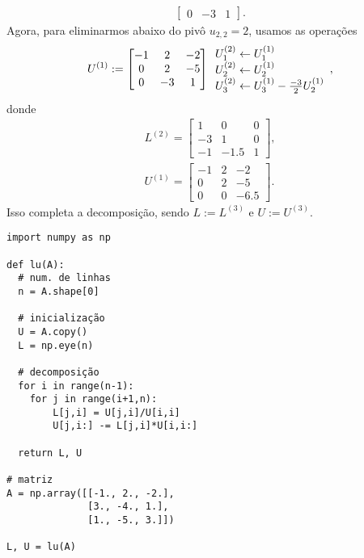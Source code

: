 \begin{ex}
\begin{align}
\begin{bmatrix}
      0 & -3 & 1
    \end{bmatrix}.
  \end{align}
  Agora, para eliminarmos abaixo do pivô $u_{2,2}=2$, usamos as operações
  \begin{equation}
    U^{(1)} :=
    \begin{bmatrix}
      -1 & 2 & -2\\
      0 & 2 & -5\\
      0 & -3 & 1
    \end{bmatrix}
    \begin{array}[]l
      U_1^{(2)}\leftarrow U_1^{(1)} \\
      U_2^{(2)}\leftarrow U_2^{(1)} \\
      U_3^{(2)}\leftarrow U_3^{(1)} - \frac{-3}{2}U_2^{(1)}
    \end{array},
  \end{equation}
  donde
  \begin{align}
    L^{(2)} =
    \begin{bmatrix}
      1 & 0 & 0\\
      -3 & 1 & 0\\
      -1 & -1.5 & 1
    \end{bmatrix},\\
    U^{(1)} =
    \begin{bmatrix}
      -1 & 2 & -2\\
      0 & 2 & -5\\
      0 & 0 & -6.5
    \end{bmatrix}.
  \end{align}
Isso completa a decomposição, sendo $L := L^{(3)}$ e $U := U^{(3)}$.

\begin{lstlisting}[caption=lu.py, label='cap_sislin_sec_lu:cod:lu']
import numpy as np

def lu(A):
  # num. de linhas
  n = A.shape[0]

  # inicialização
  U = A.copy()
  L = np.eye(n)

  # decomposição
  for i in range(n-1):
    for j in range(i+1,n):
        L[j,i] = U[j,i]/U[i,i]
        U[j,i:] -= L[j,i]*U[i,i:]

  return L, U

# matriz
A = np.array([[-1., 2., -2.],
              [3., -4., 1.],
              [1., -5., 3.]])

L, U = lu(A)
\end{lstlisting}

\end{ex}

